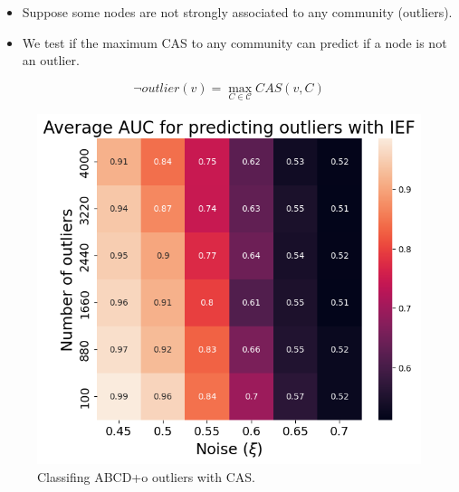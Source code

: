 \documentclass{beamer}
\begin{document}
\begin{frame}{}
    \begin{itemize}
        \color{darkblue}
        \item Suppose some nodes are not strongly associated to any community (outliers).
        \item We test if the maximum CAS to any community can predict if a node is not an outlier.
    \end{itemize}
    $$\lnot outlier(v) = \max_{C\in \mathcal{C}} CAS(v,C)$$
\end{frame}
\begin{frame}{}
    \begin{figure}
        \includegraphics[height=0.75\textheight]{figures/outlier-auc-ief.png}
        \caption{Classifing ABCD+o outliers with CAS.}
    \end{figure}
\end{frame}
\end{document}
